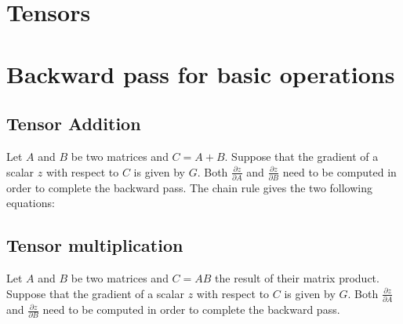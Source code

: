 



\section{Tensors}

\section{Backward pass for basic operations}

%
%
%
%   
%
%

\subsection{Tensor Addition}
Let $A$ and $B$ be two matrices and $C = A+B$. Suppose that the gradient of a
scalar $z$ with respect to $C$ is given by $G$. Both $\frac{\partial
z}{\partial A}$ and $\frac{\partial z}{\partial B}$ need to be computed in
order to complete the backward pass. The chain rule gives the two following equations:

\subsection{Tensor multiplication}

Let $A$ and $B$ be two matrices and $C = AB$ the result of their matrix
product. Suppose that the gradient of a scalar $z$ with respect to $C$ is given
by $G$. Both $\frac{\partial z}{\partial A}$ and $\frac{\partial z}{\partial
B}$ need to be computed in order to complete the backward pass.

